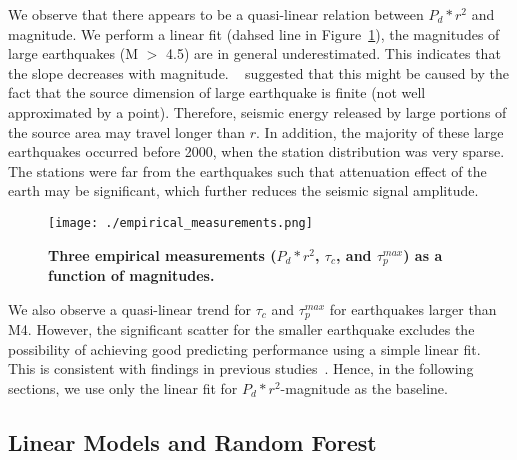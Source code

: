 \documentclass{article} %
\begin{document}
We observe that there appears to be a quasi-linear relation between $P_d * r^2$ and magnitude. We perform a linear fit (dahsed line in Figure~\ref{empirical_measurements}), the magnitudes of large earthquakes (M $>$ 4.5) are in general underestimated. This indicates that the slope decreases with magnitude. ~\cite{Wurman2007} suggested that this might be caused by the fact that the source dimension of large earthquake is finite (not well approximated by a point). Therefore, seismic energy released by large portions of the source area may travel longer than $r$. In addition, the majority of these large earthquakes occurred before 2000, when the station distribution was very sparse. The stations were far from the earthquakes such that attenuation effect of the earth may be significant, which further reduces the seismic signal amplitude.     

\begin{figure}[ht!]
	\centering
	\texttt{[image: ./empirical\_measurements.png]}
	\caption{{\bf Three empirical measurements ($P_d * r^2$, $\tau_c$, and $\tau_p^{max}$) as a function of magnitudes.}}\label{empirical_measurements} 
\end{figure}

We also observe a quasi-linear trend for $\tau_c$ and $\tau_p^{max}$ for earthquakes larger than M4. However, the significant scatter for the smaller earthquake excludes the possibility of achieving good predicting performance using a simple linear fit. This is consistent with findings in previous studies~\cite{Wurman2007}. Hence, in the following sections, we use only the linear fit for $P_d * r^2$-magnitude as the baseline.  


\subsection{Linear Models and Random Forest}
\end{document}
